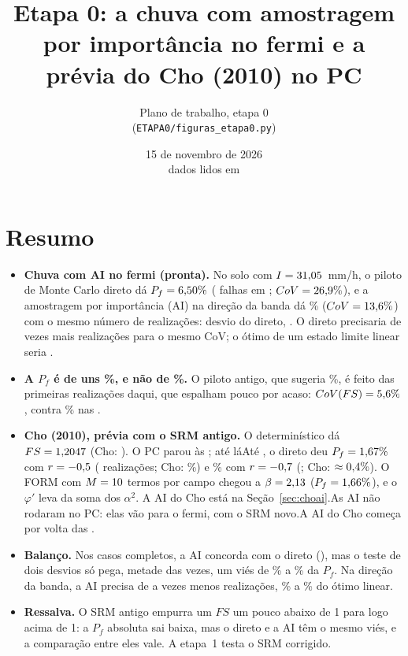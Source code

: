\documentclass[11pt,a4paper]{article}
\author{Plano de trabalho, etapa 0\\ \small(\texttt{ETAPA0/figuras\_etapa0.py})}
\title{Etapa 0: a chuva com amostragem por importância no fermi e a prévia do Cho (2010) no PC}
\date{15 de novembro de 2026\\ \small dados lidos em \HoraDados}
\begin{document}
\maketitle

\section*{Resumo}
\begin{itemize}
\item \textbf{Chuva com AI no fermi (pronta).} No solo \ChSolo{} com $I = 31{,}05$~mm/h, o piloto de Monte Carlo direto dá
$P_f = 6{,}50\%$ (\ChPNf{} falhas em \ChNP; $CoV = 26{,}9\%$), e a amostragem por importância (AI) na direção da banda
dá \ChAPf\% ($CoV = 13{,}6\%$) com o mesmo número de realizações: \ChDif{} desvio do direto, \ChVies. O direto
precisaria de \ChGanho{} vezes mais realizações para o mesmo CoV; o ótimo de um estado limite linear seria
\ChGanhoLinear.
\item \textbf{A $P_f$ é de uns \ChAPfArred\%, e não de \ChPfEsperada\%.} O piloto antigo, que sugeria \ChPfEsperada\%, é
feito das \ChVelhoN{} primeiras realizações daqui, que espalham pouco por acaso: $CoV(FS) = 5{,}6\%$, contra \ChDuzCov\%
nas \ChNP.
\item \textbf{Cho (2010), prévia com o SRM antigo.} O determinístico dá $FS = 1{,}2047$ (Cho: \ChoBishop).
\ifpcparou O PC parou às \PcParou; até lá\else Até \ChoHoraDados,\fi{} o direto deu $P_f = 1{,}67\%$ com
$r = -0{,}5$ (\ChoCincoN{} realizações; Cho: \ChoPfCinco\%) e \ChoSetePf\% com $r = -0{,}7$ (\ChoSeteN; Cho:
$\approx0{,}4\%$). O FORM com $M = 10$ termos por campo chegou a $\beta = 2{,}13$ ($P_f = 1{,}66\%$),
e o $\varphi'$ leva \FormDezAlfaPhi{} da soma dos $\alpha^2$. \ifchoaicincoiniciado A AI do Cho está na
Seção~\ref{sec:choai}.\else\ifpcparou As AI não rodaram no PC: elas vão para o fermi, com o SRM novo.\else A AI do Cho
começa por volta das \ChoInicioAI.\fi\fi
\item \textbf{Balanço.} Nos \BalNCasos{} casos completos, a AI concorda com o direto (\BalVies), mas o teste de dois
desvios só pega, metade das vezes, um viés de \RbVmdBanda\% a \ChVmd\% da $P_f$. Na direção da banda, a AI precisa de \BalGanhoMin{} a
\BalGanhoMax{} vezes menos realizações, \BalFracMin\% a \BalFracMax\% do ótimo linear.
\item \textbf{Ressalva.} O SRM antigo empurra um $FS$ um pouco abaixo de 1 para logo acima de 1: a $P_f$ absoluta sai
baixa, mas o direto e a AI têm o mesmo viés, e a comparação entre eles vale. A etapa~1 testa o SRM corrigido.
\end{itemize}
\end{document}
